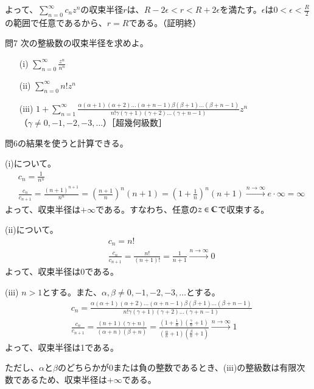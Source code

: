 よって、$\sum_{n=0}^\infty c_nz^n$の収束半径$r$は、$R-2\epsilon<r<R+2\epsilon$を満たす。$\epsilon$は$0<\epsilon<\frac{R}{2}$の範囲で任意であるから、$r=R$である。（証明終）

\begin{mysimplebox}{問7}
    次の整級数の収束半径を求めよ。
    \begin{itemize}
        \item[(i)]{$\displaystyle\sum_{n=0}^{\infty}\frac{z^n}{n^n}$}
        \item[(ii)]{$\displaystyle\sum_{n=0}^{\infty}n!z^n$}
        \item[(iii)]{$\displaystyle 1+\sum_{n=1}^{\infty}\frac{\alpha(\alpha+1)(\alpha+2)\dots(\alpha+n-1)\beta(\beta+1)\dots(\beta+n-1)}{n!\gamma(\gamma+1)(\gamma+2)\dots(\gamma+n-1)}z^n$\\（$\gamma\neq 0, -1,-2,-3,\dots$）［超幾何級数］} 
    \end{itemize}
\end{mysimplebox}
問6の結果を使うと計算できる。

(i)について。
\begin{align*}
    &c_n=\frac{1}{n^n}\\
    &\frac{c_n}{c_{n+1}}=\frac{(n+1)^{n+1}}{n^n}=\left(\frac{n+1}{n}\right)^n(n+1)=\left(1+\frac{1}{n}\right)^n(n+1)\overset{n\longrightarrow\infty}{\longrightarrow}e\cdot \infty=\infty
\end{align*}
よって、収束半径は$+\infty$である。すなわち、任意の$z\in\mathbb{C}$で収束する。

(ii)について。
\begin{align*}
    &c_n=n!\\
    &\frac{c_n}{c_{n+1}}=\frac{n!}{(n+1)!}=\frac{1}{n+1}\overset{n\longrightarrow\infty}{\longrightarrow}0
\end{align*}
よって、収束半径は0である。

(iii)
$n>1$とする。また、$\alpha, \beta\neq 0, -1,-2,-3,\dots$とする。
\begin{align*}
    &c_n=\frac{\alpha(\alpha+1)(\alpha+2)\dots(\alpha+n-1)\beta(\beta+1)\dots(\beta+n-1)}{n!\gamma(\gamma+1)(\gamma+2)\dots(\gamma+n-1)}\\
    &\frac{c_n}{c_{n+1}}=\frac{(n+1)(\gamma+n)}{(\alpha+n)(\beta+n)}=\frac{(1+\frac{1}{n})(\frac{\gamma}{n}+1)}{(\frac{\alpha}{n}+1)(\frac{\beta}{n}+1)}\overset{n\longrightarrow\infty}{\longrightarrow}1
\end{align*}
よって、収束半径は1である。

ただし、$\alpha$と$\beta$のどちらかが0または負の整数であるとき、(iii)の整級数は有限次数であるため、収束半径は$+\infty$である。

